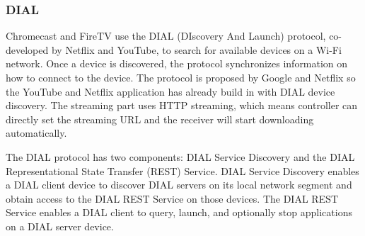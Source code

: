 \subsubsection{DIAL} 
Chromecast and FireTV use the DIAL \cite{dial} (DIscovery And Launch) protocol, 
co-developed by Netflix and YouTube, to search for available devices on a Wi-Fi network. 
Once a device is discovered, the protocol synchronizes information on how to 
connect to the device. The protocol is proposed by Google and Netflix so the 
YouTube and Netflix application has already build in with DIAL device discovery. The 
streaming part uses HTTP streaming, which means controller can directly set the 
streaming URL and the receiver will start downloading automatically. 

The DIAL protocol has two components: DIAL Service Discovery and the DIAL 
Representational State Transfer (REST) Service. DIAL Service Discovery enables a 
DIAL client device to discover DIAL servers on its local network segment and 
obtain access to the DIAL REST Service on those devices. The DIAL REST Service 
enables a DIAL client to query, launch, and optionally stop applications on a 
DIAL server device. 

